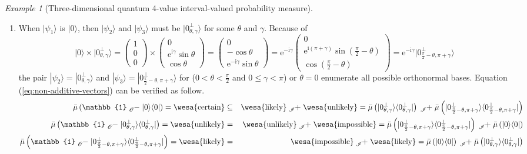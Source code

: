 \documentclass{article}
\theoremstyle{remark}
\newtheorem{example}{Example}
\newcommand{\ket}[1]{|#1\rangle}
\newcommand{\proj}[1]{|#1 \rangle\langle #1 |}
\newcommand{\imposs}{{\mbox{\wesa{impossible}}}}
\newcommand{\likely}{{\mbox{\wesa{likely}}}}
\newcommand{\unlikely}{{\mbox{\wesa{unlikely}}}}
\newcommand{\necess}{{\mbox{\wesa{certain}}}}
\newcommand{\rme}{\mathrm{e}}
\newcommand{\rmi}{\mathrm{i}}
\begin{document}
\begin{example}[Three-dimensional quantum 4-value interval-valued
probability measure]
\begin{enumerate}
\item When $\ket{\psi_{1}}$ is $\ket{0}$, then $\ket{\psi_{2}}$ and $\ket{\psi_{3}}$
must be $\ket{0_{\theta,\gamma}^{\perp}}$ for some $\theta$ and
$\gamma$. Because of 
\[
\ket{0}\times\ket{0_{\theta,\gamma}^{\perp}}=\begin{pmatrix}1\\
0\\
0
\end{pmatrix}\times\begin{pmatrix}0\\
\rme^{\rmi\gamma}\sin\theta\\
\cos\theta
\end{pmatrix}=\begin{pmatrix}0\\
-\cos\theta\\
\rme^{-\rmi\gamma}\sin\theta
\end{pmatrix}=\rme^{-\rmi\gamma}\begin{pmatrix}0\\
\rme^{\rmi\left(\pi+\gamma\right)}\sin\left(\frac{\pi}{2}-\theta\right)\\
\cos\left(\frac{\pi}{2}-\theta\right)
\end{pmatrix}=\rme^{-\rmi\gamma}\ket{0_{\frac{\pi}{2}-\theta,\pi+\gamma}^{\perp}}
\]
the pair $\ket{\psi_{2}}=\ket{0_{\theta,\gamma}^{\perp}}$ and $\ket{\psi_{3}}=\ket{0_{\frac{\pi}{2}-\theta,\pi+\gamma}^{\perp}}$
for ($0<\theta<\frac{\pi}{2}$ and $0\le\gamma<\pi$) or $\theta=0$
enumerate all possible orthonormal bases. Equation (\ref{eq:non-additive-vectors})
can be verified as follow. 
\begin{eqnarray*}
\bar{\mu}\left(\mathbb{1}\tensor*[_{\mathscr{O}}]{-}{}\proj{0}\right)=\necess & \subseteq & \likely\tensor*[_{\mathscr{I}}]{+}{}\unlikely=\bar{\mu}\left(\proj{0_{\theta,\gamma}^{\perp}}\right)\tensor*[_{\mathscr{I}}]{+}{}\bar{\mu}\left(\proj{0_{\frac{\pi}{2}-\theta,\pi+\gamma}^{\perp}}\right)\\
\bar{\mu}\left(\mathbb{1}\tensor*[_{\mathscr{O}}]{-}{}\proj{0_{\theta,\gamma}^{\perp}}\right)=\unlikely & = & \unlikely\tensor*[_{\mathscr{I}}]{+}{}\imposs=\bar{\mu}\left(\proj{0_{\frac{\pi}{2}-\theta,\pi+\gamma}^{\perp}}\right)\tensor*[_{\mathscr{I}}]{+}{}\bar{\mu}\left(\proj{0}\right)\\
\bar{\mu}\left(\mathbb{1}\tensor*[_{\mathscr{O}}]{-}{}\proj{0_{\frac{\pi}{2}-\theta,\pi+\gamma}^{\perp}}\right)=\likely & = & \imposs\tensor*[_{\mathscr{I}}]{+}{}\likely=\bar{\mu}\left(\proj{0}\right)\tensor*[_{\mathscr{I}}]{+}{}\bar{\mu}\left(\proj{0_{\theta,\gamma}^{\perp}}\right)

\end{eqnarray*}
\end{enumerate}
\end{example}
\end{document}
